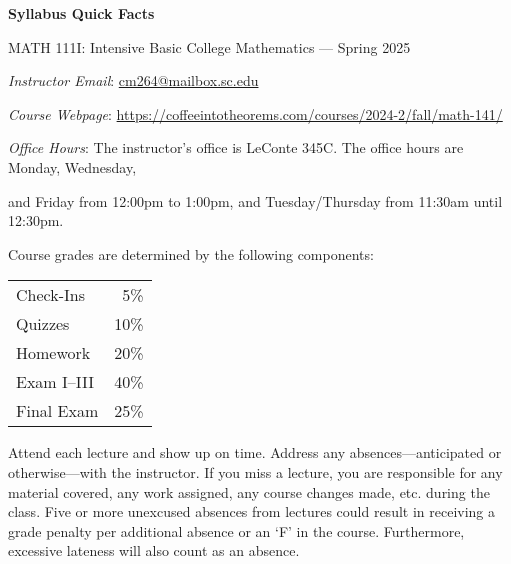 \documentclass[11pt,letterpaper]{article}
\begin{document}
\begin{center} 
\bfseries
\color{scred}
\LARGE Syllabus Quick Facts \par\vspace{0.2\baselineskip}
\Large MATH 111I: Intensive Basic College Mathematics --- Spring 2025
\end{center} 


\hspace{0.53cm} {\itshape Instructor Email}: \href{mailto:cm264@mailbox.sc.edu}{cm264@mailbox.sc.edu} \par
\hspace{0.53cm} {\itshape Course Webpage}: \href{https://coffeeintotheorems.com/courses/2024-2/fall/math-141/}{https://coffeeintotheorems.com/courses/2024-2/fall/math-141/} \par
\hspace{0.53cm} {\itshape Office Hours}: The instructor's office is LeConte 345C. The office hours are Monday, Wednesday, \par \hspace{0.55cm} and Friday from 12:00pm to 1:00pm, and Tuesday/Thursday from 11:30am until 12:30pm. \pspace


Course grades are determined by the following components: \par \vspace{-0.3cm}
	\begin{table}[!ht]
        \begin{tabular}{lr}
	Check-Ins & 5\% \\
	Quizzes & 10\% \\
	Homework & 20\% \\
	Exam I--III & 40\% \\
	Final Exam & 25\%
        \end{tabular} 
        \end{table}


Attend each lecture and show up on time. Address any absences---anticipated or otherwise---with the instructor. If you miss a lecture, you are responsible for any material covered, any work assigned, any course changes made, etc. during the class. Five or more unexcused absences from lectures could result in receiving a grade penalty per additional absence or an `F' in the course. Furthermore, excessive lateness will also count as an absence. 
\pspace
\end{document}

